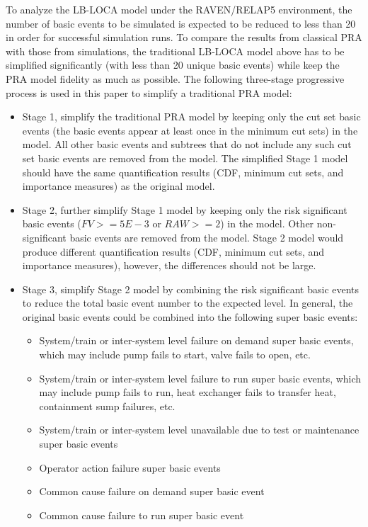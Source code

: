 To analyze the LB-LOCA model under the RAVEN/RELAP5 environment, the number of basic events to be simulated is expected to be reduced to less than 20 in order for successful simulation runs. To compare the results from classical PRA with those from simulations, the traditional LB-LOCA model above has to be simplified significantly (with less than 20 unique basic events) while keep the PRA model fidelity as much as possible.
The following three-stage progressive process is used in this paper to simplify a traditional PRA model:
\begin{itemize}
    \item Stage 1, simplify the traditional PRA model by keeping only the cut set basic events (the basic events appear at least once in the minimum cut sets) in the model. All other basic events and subtrees that do not include any such cut set basic events are removed from the model. The simplified Stage 1 model should have the same quantification results (CDF, minimum cut sets, and importance measures) as the original model.
    \item Stage 2, further simplify Stage 1 model by keeping only the risk significant basic events ($FV >= 5E-3$ or $RAW >= 2$) in the model. Other non-significant basic events are removed from the model. Stage 2 model would produce different quantification results (CDF, minimum cut sets, and importance measures), however, the differences should not be large.
    \item Stage 3, simplify Stage 2 model by combining the risk significant basic events to reduce the total basic event number to the expected level. In general, the original basic events could be combined into the following super basic events:
    \begin{itemize}
        \item System/train or inter-system level failure on demand super basic events, which may include pump fails to start, valve fails to open, etc.
        \item System/train or inter-system level failure to run super basic events, which may include pump fails to run, heat exchanger fails to transfer heat, containment sump failures, etc.
        \item System/train or inter-system level unavailable due to test or maintenance super basic events
        \item Operator action failure super basic events
        \item Common cause failure on demand super basic event
        \item Common cause failure to run super basic event
    \end{itemize}
\end{itemize}

